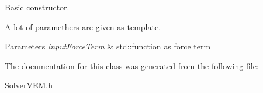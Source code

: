 Basic constructor. 

A lot of paramethers are given as template.


\begin{DoxyParams}{Parameters}
{\em input\+Force\+Term} & std\+::function as force term \\
\hline
\end{DoxyParams}


The documentation for this class was generated from the following file\+:\begin{DoxyCompactItemize}
\item 
Solver\+V\+E\+M.\+h\end{DoxyCompactItemize}
